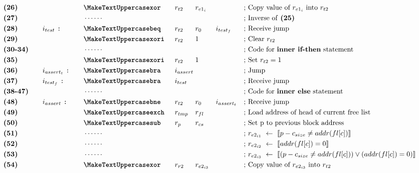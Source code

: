 \begin{figure}[ht]
\begin{subfigure}{.7\textwidth}
{\begin{minipage}{\linewidth}
\begin{alignat*}{7}
                &\textbf{(26)}\quad&& &&\inst{xor}\quad &&r_{t2} && r_{e1_i} && &&\text{; Copy value of $r_{e1_i}$ into $r_{t2}$}\\        
                &\textbf{(27)}\quad&& &&\cdots\cdots && && && &&\text{; Inverse of \textbf{(25)}}\\
                &\textbf{(28)}\quad&&i_{test}\ \texttt{:}\quad &&\inst{beq} &&r_{t2} && r_0 && i_{test_f} && \text{; Receive jump}\\
                &\textbf{(29)}\quad&& &&\inst{xori} &&r_{t2} && 1 && && \text{; Clear $r_{t2}$}\\
                &\textbf{(30-34)}\quad&& &&\cdots\cdots && && && &&\text{; Code for \textbf{inner if-then} statement}\\
                &\textbf{(35)}\quad&& &&\inst{xori} &&r_{t2} && 1 && && \text{; Set $r_{t2} = 1$}\\
                &\textbf{(36)}\quad&&i_{assert_t}\ \texttt{:}\quad &&\inst{bra} &&i_{assert} \span\omit\span\quad \span\omit\span\quad && \text{; Jump}\\
                &\textbf{(37)}\quad&&i_{test_f}\ \texttt{:}\quad &&\inst{bra} &&i_{test} \span\omit\span\quad \span\omit\span\quad && \text{; Receive jump}\\
                &\textbf{(38-47)}\quad&& &&\cdots\cdots && && && &&\text{; Code for \textbf{inner else} statement}\\
                &\textbf{(48)}\quad&&i_{assert}\ \texttt{:}\quad &&\inst{bne} &&r_{t2} && r_0 && i_{assert_t} && \text{; Receive jump}\\
                &\textbf{(49)}\quad&& &&\inst{exch} &&r_{tmp} && r_{fl} && && \text{; Load address of head of current free list}\\
                &\textbf{(50)}\quad&& &&\inst{sub} &&r_{p} && r_{cs} && && \text{; Set p to previous block address}\\
                &\textbf{(51)}\quad&& &&\cdots\cdots && && && &&\text{; $r_{e2_{i1}}\ \leftarrow\ \llbracket p - c_{size} \neq addr(fl[c])\rrbracket$}\\
                &\textbf{(52)}\quad&& &&\cdots\cdots && && && &&\text{; $r_{e2_{i2}}\ \leftarrow\ \llbracket addr(fl[c]) = 0 \rrbracket$}\\
                &\textbf{(53)}\quad&& &&\cdots\cdots && && && &&\text{; $r_{e2_{i3}}\ \leftarrow\ \llbracket (p - c_{size} \neq addr(fl[c])) \vee (addr(fl[c]) = 0) \rrbracket$}\\
                &\textbf{(54)}\quad&& &&\inst{xor} &&r_{r2} && r_{e2_{i3}} && && \text{; Copy value of $r_{e2_{i3}}$ into $r_{t2}$}\\

\end{alignat*}
\end{minipage}}
\end{subfigure}
\end{figure}

